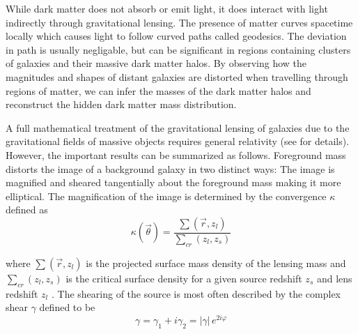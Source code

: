 \documentclass[%
 reprint,
 amsmath,amssymb,
 aps,nofootinbib
]{revtex4-1}
\begin{document}
While dark matter does not absorb or emit light, it does interact with light indirectly through gravitational lensing. The presence of matter curves spacetime locally which causes light to follow curved paths called geodesics. The deviation in path is usually negligable, but can be significant in regions containing clusters of galaxies and their massive dark matter halos. By observing how the magnitudes and shapes of distant galaxies are distorted when travelling through regions of matter, we can infer the masses of the dark matter halos and reconstruct the hidden dark matter mass distribution. %


A full mathematical treatment of the gravitational lensing of galaxies due to the gravitational fields of massive objects requires general relativity (see \cite{modern_cosmology} for details). However, the important results can be summarized as follows. Foreground mass distorts the image of a background galaxy in two distinct ways: The image is magnified and sheared tangentially about the foreground mass making it more elliptical. The magnification of the image is determined by the convergence $\kappa$ defined as
\begin{equation}\label{convergence}
\kappa(\vec{\theta})=\frac{\sum(\vec{r},z_l)}{\sum_{cr}(z_l,z_s)}
\end{equation}

\noindent where $\sum(\vec{r},z_l)$ is the projected surface mass density of the lensing mass and $\sum_{cr}(z_l,z_s)$ is the critical surface density for a given source redshift $z_s$ and lens redshift $z_l$ \cite{schneider}. The shearing of the source is most often described by the complex shear $\gamma$ defined to be
\begin{equation}\label{complex_shear}
\gamma=\gamma_1+i\gamma_2=|\gamma|\,e^{2i\varphi}
\end{equation}
\end{document}
